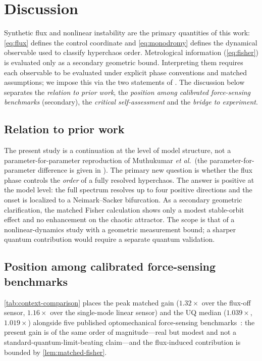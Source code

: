\documentclass[preprint,numbers,a4paper]{elsarticle}
\begin{document}
\section{Discussion}

Synthetic flux and nonlinear instability are the primary quantities of this work: \cref{eq:flux} defines the control coordinate and \cref{eq:monodromy} defines the dynamical observable used to classify hyperchaos order. Metrological information (\cref{eq:fisher}) is evaluated only as a secondary geometric bound. Interpreting them requires each observable to be evaluated under explicit phase conventions and matched assumptions; we impose this via the two statements of . The discussion below separates the \emph{relation to prior work}, the \emph{position among calibrated force-sensing benchmarks} (secondary), the \emph{critical self-assessment} and the \emph{bridge to experiment}.

\subsection{Relation to prior work}

The present study is a continuation at the level of model structure, not a parameter-for-parameter reproduction of Muthukumar \emph{et al.}~(the parameter-for-parameter difference is given in ). The primary new question is whether the flux phase controls the \emph{order} of a fully resolved hyperchaos. The answer is positive at the model level: the full spectrum resolves up to four positive directions and the onset is localized to a Neimark--Sacker bifurcation. As a secondary geometric clarification, the matched Fisher calculation shows only a modest stable-orbit effect and no enhancement on the chaotic attractor. The scope is that of a nonlinear-dynamics study with a geometric measurement bound; a sharper quantum contribution would require a separate quantum validation.

\subsection{Position among calibrated force-sensing benchmarks}
\label{sec:comparison}

\cref{tab:context-comparison} places the peak matched gain ($\num{1.32}\times$ over the flux-off sensor, $\num{1.16}\times$ over the single-mode linear sensor) and the UQ median ($\num{1.039}\times$, $\num{1.019}\times$) alongside five published optomechanical force-sensing benchmarks~\cite{teufel2011,purdy2017,gavartin2012,li2021a,qvarfort2018}: the present gain is of the same order of magnitude---real but modest and not a standard-quantum-limit-beating claim---and the flux-induced contribution is bounded by \cref{lem:matched-fisher}.
\end{document}
